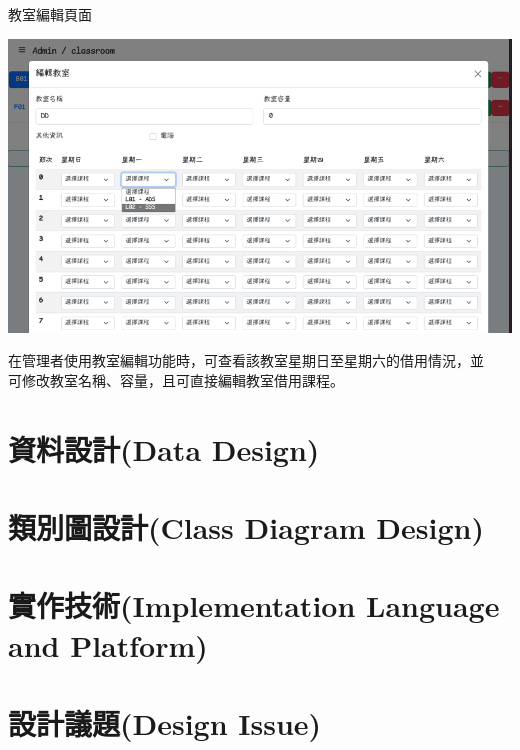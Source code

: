 \documentclass{article}
\begin{document}
	\begin{Large}
		教室編輯頁面
	\end{Large}
	\bigskip
	\begin{center}
		\includegraphics[scale=0.5]{SDDAdminClassroomEditing.png}
	\end{center}
	\bigskip
	\bigskip
	在管理者使用教室編輯功能時，可查看該教室星期日至星期六的借用情況，並
	\\可修改教室名稱、容量，且可直接編輯教室借用課程。

	\bigskip
	\bigskip
	\bigskip
	\bigskip
	\bigskip

\newpage

\section[資料設計(DATA DESIGN)]{資料設計(Data Design)}

\newpage

\section[類別圖設計(CLASS DIAGRAM DESIGN)]{類別圖設計(Class Diagram Design)}

\newpage

\section[實作技術(IMPLEMENTATION LANGUAGE AND PLATFORM)]{實作技術(Implementation Language and Platform)}

\newpage

\section[設計議題(DESIGN ISSUE)]{設計議題(Design Issue)}
\end{document}
